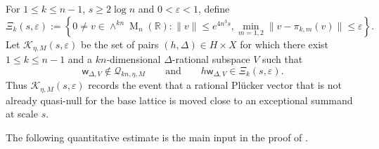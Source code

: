 \documentclass[reqno,11pt]{amsart}
\numberwithin{equation}{section}
\theoremstyle{definition}
\theoremstyle{remark}
\newcommand{\op}{\operatorname}
\newcommand{\M}{\op{M}}
\begin{document}
For $1\le k\le n-1$, $s\ge 2\log n$ and
$0<\varepsilon<1$, define
$$
\Xi_k(s,\varepsilon)
:=
\left\{
0\ne v\in\wedge^{kn}\M_n(\mathbb R):
\|v\|\le e^{4n^3s},
\min_{m=1,2}\|v-\pi_{k,m}(v)\|\le\varepsilon
\right\}.
$$
Let $\mathcal K_{\eta,M}(s,\varepsilon)$ be the set of pairs
$(h,\Delta)\in H\times X$ for which there exist $1\le k\le n-1$ and a
$kn$-dimensional $\Delta$-rational subspace $V$ such that
$$
\mathsf w_{\Delta,V}\notin\mathscr Q_{kn,\eta,M}
\qquad\text{and}\qquad
h\mathsf w_{\Delta,V}\in\Xi_k(s,\varepsilon).
$$
Thus $\mathcal K_{\eta,M}(s,\varepsilon)$ records the event that a
rational Pl\"ucker vector that is not already quasi-null for the base
lattice is moved close to an exceptional summand at scale
$s$.

The following quantitative estimate is the main input in the proof of .
\end{document}
